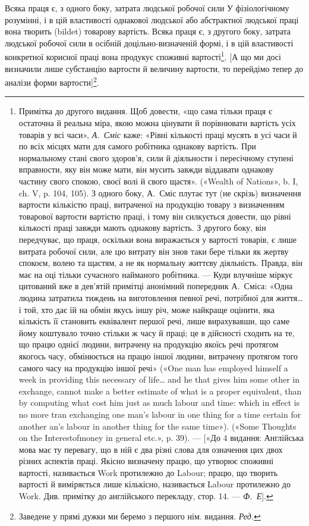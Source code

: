 Всяка праця є, з одного боку, затрата людської робочої сили
У фізіологічному розумінні, і в цій властивості однакової людської
або абстрактної людської праці вона творить (bildet) товарову
вартість. Всяка праця є, з другого боку, затрата людської робочої
сили в осібній доцільно-визначеній формі, і в цій властивості
конкретної корисної праці вона продукує споживні вартості\footnote{
Примітка до другого видання. Щоб довести, «що сама тільки праця є
остаточна й реальна міра, якою можна цінувати й порівнювати вартість
усіх товарів у всі часи», \emph{А.~Сміс} каже: «Рівні кількості праці мусять в
усі часи й по всіх місцях мати для самого робітника однакову вартість.
При нормальному стані свого здоров'я, сили й діяльности і пересічному
ступені вправности, яку він може мати, він мусить завжди віддавати однакову
частину свого спокою, своєї волі й свого щастя». («Wealth of Nations»,
b. I, ch. V, p. 104, 105). З одного боку, А.~Сміс плутає тут (не скрізь)
визначення вартости кількістю праці, витраченої на продукцію товару
з визначенням товарової вартости вартістю праці, і тому він силкується
довести, що рівні кількості праці завжди мають однакову вартість. З другого
боку, він передчуває, що праця, оскільки вона виражається у вартості
товарів, є лише витрата робочої сили, але цю витрату він знов таки
бере тільки як жертву спокоєм, волею та щастям, а не як нормальну життєву
діяльність. Правда, він має на оці тільки сучасного найманого робітника.
— Куди влучніше міркує цитований вже в дев’ятій примітці анонімний
попередник А.~Сміса: «Одна людина затратила тиждень на виготовлення
певної речі, потрібної для життя\dots{} і той, хто дає їй на обмін якусь
іншу річ, може найкраще оцінити, яка кількість її становить еквівалент
першої речі, лише вирахувавши, що саме йому коштувало точно стільки ж
часу й праці; це в дійсності сходить на те, що працю однієї людини, витрачену
на продукцію якоїсь речі протягом якогось часу, обмінюється
на працю іншої людини, витрачену протягом того самого часу на продукцію
іншої речі» («One man has employed himself a week in providing this
necessary of life\dots{} and he that gives him some other in exchange, cannot
make a better estimate of what is a proper equivalent, than by computing what
cost him just as much labour and time: which in effect is no more tran exchanging
one man’s labour in one thing for a time certain for another an’s labour
in another thing for the same time»). («Some Thoughts on the Interestofmoney
in general etc.», p. 39). — [«До 4 видання: Англійська мова має
ту перевагу, що в ній є два різні слова для означення цих двох різних аспектів
праці. Якісно визначену працю, що утворює споживні вартості,
називається Work протилежно до Labour; працю, що творить вартості
й виміряється лише кількісно, називається Labour протилежно до Work.
Див. примітку до англійського перекладу, стор. 14. — \emph{Ф.~Е}].}.
[А що ми досі визначили лише субстанцію вартости й величину
вартости, то перейдімо тепер до аналізи форми вартости]\footnote*{
Заведене у прямі дужки ми беремо з першого нім. видання. \emph{Ред.}
}.

